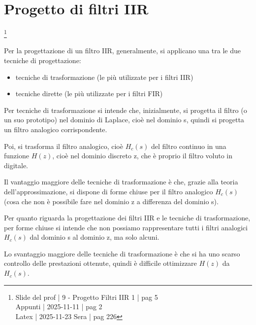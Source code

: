 \newpage 

\section{Progetto di filtri IIR} \label{sec: Progetto di filtri IIR}

\footnote{ 
    Slide del prof | 9 - Progetto Filtri IIR 1 | pag 5\\
    Appunti | 2025-11-11 | pag 2 \\ 
    Latex | 2025-11-23 Sera | pag 226   
} 

Per la progettazione di un filtro IIR, generalmente, si applicano una tra le due tecniche di progettazione: 

\begin{itemize}
    \item tecniche di trasformazione (le più utilizzate per i filtri IIR)
    \item tecniche dirette (le più utilizzate per i filtri FIR)
\end{itemize}

Per tecniche di trasformazione si intende che, inizialmente, si progetta il filtro (o un suo prototipo) nel dominio di Laplace, cioè nel dominio s, 
quindi si progetta un filtro analogico corrispondente. \newline 

Poi, si trasforma il filtro analogico, cioè $H_c \left(s\right)$ del filtro continuo in una funzione $H \left(z\right)$, cioè nel dominio discreto z, che è proprio il filtro voluto in digitale. \newline 

Il vantaggio maggiore delle tecniche di trasformazione è che, grazie alla teoria dell'approssimazione, si dispone di forme chiuse per il filtro analogico $H_c \left(s\right)$ (cosa che non è possibile fare nel dominio z a differenza del dominio s). \newline 

Per quanto riguarda la progettazione dei filtri IIR e le tecniche di trasformazione, 
per forme chiuse si intende che non possiamo rappresentare tutti i filtri analogici $H_c \left(s\right)$ dal dominio s al dominio z, ma solo alcuni. \newline 

Lo svantaggio maggiore delle tecniche di trasformazione è che si ha uno scarso controllo delle prestazioni ottenute, quindi è difficile ottimizzare $H \left(z\right)$ da $H_c \left(s\right)$. \newline 

